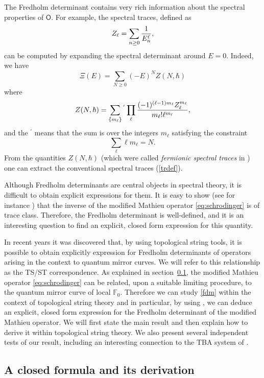 \documentclass[a4paper,11pt]{article}
\theoremstyle{definition}
\def\IF{{\mathbb F}}
\newcommand{\mO}{\mathsf{O}}
\newcommand{\be}{\begin{equation}}
\newcommand{\ee}{\end{equation}}
\def\IF{\mathbb{F}}
\begin{document}
The Fredholm determinant contains very rich information about the spectral properties of $\mO$. For example, the spectral traces, defined as
%
 \be\label{trdef} Z_\ell=\sum_{n \geq 0}{1\over E_n^\ell}, 
 \ee
can be computed by expanding the spectral determinant around $E=0$. Indeed, we have
  \be 
  \Xi(E)=\sum_{N\geq 0} (-E)^N Z(N,\hbar) 
  \ee
where
%
\be
\label{conjclasses}
Z(N, \hbar) =\sum_{\{ m_\ell \}} {}^{'}\prod_\ell   {(-1)^{(\ell-1)m_\ell } Z_\ell^{m_\ell} \over m_\ell! \ell^{m_\ell}},
\ee
%
and the $ {}^{'}$ means that the sum is over the integers $m_\ell$ satisfying the constraint
%
\be
\label{Ncons}
\sum_\ell \ell m_\ell=N.
\ee
%
From the quantities $Z(N, \hbar)$ (which were called {\it fermionic
  spectral traces} in \cite{ghm}) one can extract the conventional
spectral traces (\ref{trdef}).

Although Fredholm determinants are central objects in spectral theory,
it is difficult to obtain explicit expressions for them. It is easy to
show (see for instance \cite{lst}) that the inverse of the modified
Mathieu operator \eqref{eq:schrodinger} is of trace class. Therefore,
the Fredholm determinant is well-defined, and it is an interesting
question to find an explicit, closed form expression for this
quantity.

In recent years it was discovered \cite{km, hw, cgm8, ghm, cgm} that, by
using topological string tools, it is possible to obtain explicitly
expression for Fredholm determinants of operators arising in the
context to quantum mirror curves.  We will refer to this relationship
as the TS/ST correspondence. As explained in section~\ref{deri}, the
modified Mathieu operator \eqref{eq:schrodinger} can be related, upon
a suitable limiting procedure, to the quantum mirror curve of local
$\IF_0$. Therefore we can study \eqref{fdm} within the context of
topological string theory and in particular, by using \cite{ghm, gm3},
we can deduce an explicit, closed form expression for the Fredholm
determinant of the modified Mathieu operator.  We will first state the
main result and then explain how to derive it within topological
string theory. We also present several independent tests of our
result, including an interesting connection to the TBA system of
\cite{post-zamo}.

\subsection{A closed formula and its derivation}
\label{deri}
\end{document}
